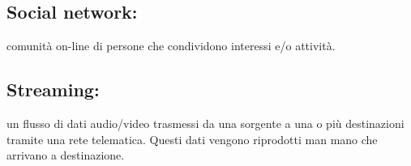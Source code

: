 \subsection*{Social network:} comunit\`a on-line di persone che condividono
interessi e/o attivit\`a.
\subsection*{Streaming:} un flusso di dati audio/video trasmessi da una sorgente
a una o pi\`u destinazioni tramite una rete telematica. Questi dati vengono
riprodotti man mano che arrivano a destinazione.


